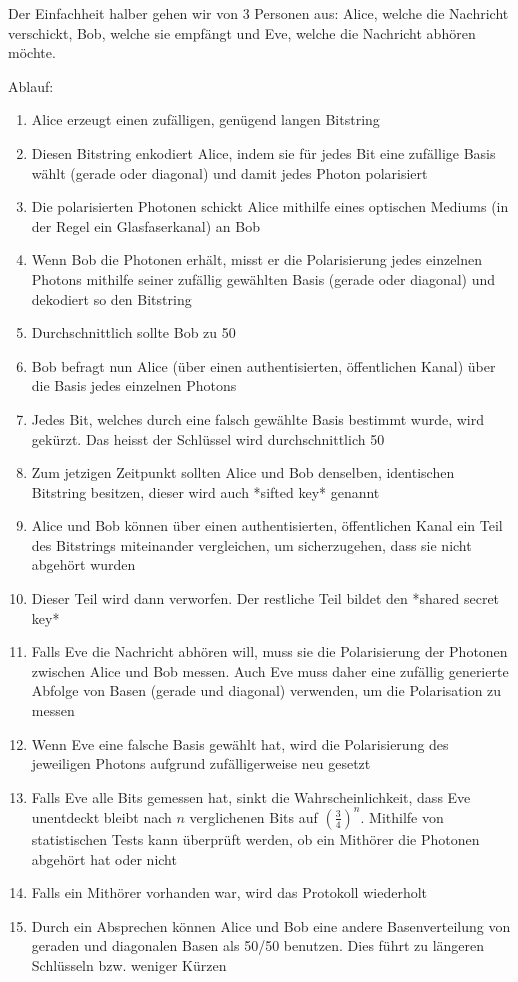 \documentclass[a4paper,10.2pt,pdftex]{scrartcl}%
\begin{document}
Der Einfachheit halber gehen wir von 3 Personen aus: Alice, welche die Nachricht verschickt, Bob, welche sie empfängt und Eve, welche die Nachricht abhören möchte.

Ablauf:
\begin{enumerate}
\item Alice erzeugt einen zufälligen, genügend langen Bitstring
\item  Diesen Bitstring enkodiert Alice, indem sie für jedes Bit eine zufällige Basis wählt (gerade oder diagonal) und damit jedes Photon polarisiert
\item  Die polarisierten Photonen schickt Alice mithilfe eines optischen Mediums (in der Regel ein Glasfaserkanal) an Bob
\item  Wenn Bob die Photonen erhält, misst er die Polarisierung jedes einzelnen Photons mithilfe seiner zufällig gewählten Basis (gerade oder diagonal) und dekodiert so den Bitstring
\item  Durchschnittlich sollte Bob zu 50%
\item  Bob befragt nun Alice (über einen authentisierten, öffentlichen Kanal) über die Basis jedes einzelnen Photons
\item Jedes Bit, welches durch eine falsch gewählte Basis bestimmt wurde, wird gekürzt. Das heisst der Schlüssel wird durchschnittlich 50%
\item  Zum jetzigen Zeitpunkt sollten Alice und Bob denselben, identischen Bitstring besitzen, dieser wird auch *sifted key* genannt
\item  Alice und Bob können über einen authentisierten, öffentlichen Kanal ein Teil des Bitstrings miteinander vergleichen, um sicherzugehen, dass sie nicht abgehört wurden
\item  Dieser Teil wird dann verworfen. Der restliche Teil bildet den *shared secret key*
\item  Falls Eve die Nachricht abhören will, muss sie die Polarisierung der Photonen zwischen Alice und Bob messen. Auch Eve muss daher eine zufällig generierte Abfolge von Basen (gerade und diagonal) verwenden, um die Polarisation zu messen
\item  Wenn Eve eine falsche Basis gewählt hat, wird die Polarisierung des jeweiligen Photons aufgrund zufälligerweise neu gesetzt
\item  Falls Eve alle Bits gemessen hat, sinkt die Wahrscheinlichkeit, dass Eve unentdeckt bleibt nach $n$ verglichenen Bits auf $(\frac{3}{4})^n$. Mithilfe von statistischen Tests kann überprüft werden, ob ein Mithörer die Photonen abgehört hat oder nicht
\item  Falls ein Mithörer vorhanden war, wird das Protokoll wiederholt
\item  Durch ein Absprechen können Alice und Bob eine andere Basenverteilung von geraden und diagonalen Basen als 50/50 benutzen. Dies führt zu längeren Schlüsseln bzw. weniger Kürzen
\end{enumerate}
\end{document}
